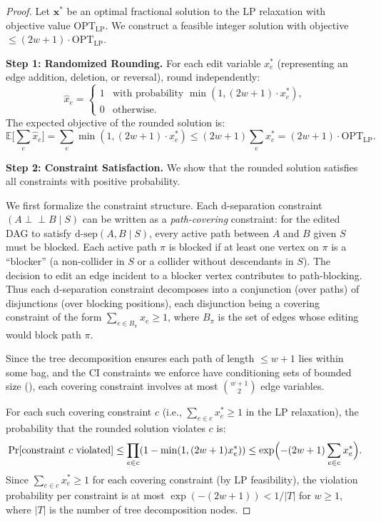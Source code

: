 \documentclass[11pt,a4paper]{article}
\theoremstyle{definition}
\theoremstyle{remark}
\newcommand{\CI}{\perp\!\!\!\perp}
\newcommand{\dsep}{\mathrm{d\text{-}sep}}
\newcommand{\E}{\mathbb{E}}
\begin{document}
\begin{proof}
Let $\mathbf{x}^*$ be an optimal fractional solution to the LP relaxation with objective
value $\mathrm{OPT}_{\mathrm{LP}}$. We construct a feasible integer solution with
objective $\leq (2w+1) \cdot \mathrm{OPT}_{\mathrm{LP}}$.

\medskip
\noindent\textbf{Step 1: Randomized Rounding.}
For each edit variable $x_e^*$ (representing an edge addition, deletion, or reversal),
round independently:
\[
  \hat{x}_e = \begin{cases}
    1 & \text{with probability } \min(1, (2w+1) \cdot x_e^*), \\
    0 & \text{otherwise.}
  \end{cases}
\]
The expected objective of the rounded solution is:
\[
  \E\bigl[\textstyle\sum_e \hat{x}_e\bigr]
  = \sum_e \min(1, (2w+1) \cdot x_e^*)
  \leq (2w+1) \sum_e x_e^*
  = (2w+1) \cdot \mathrm{OPT}_{\mathrm{LP}}.
\]

\medskip
\noindent\textbf{Step 2: Constraint Satisfaction.}
We show that the rounded solution satisfies all constraints with positive probability.

We first formalize the constraint structure. Each d-separation constraint
$(A \CI B \mid S)$ can be written as a \emph{path-covering} constraint: for the edited
DAG to satisfy $\dsep(A, B \mid S)$, every active path between $A$ and $B$ given $S$
must be blocked. Each active path $\pi$ is blocked if at least one vertex on $\pi$ is a
``blocker'' (a non-collider in $S$ or a collider without descendants in $S$). The
decision to edit an edge incident to a blocker vertex contributes to path-blocking.
Thus each d-separation constraint decomposes into a conjunction (over paths) of
disjunctions (over blocking positions), each disjunction being a covering constraint
of the form $\sum_{e \in B_\pi} x_e \geq 1$, where $B_\pi$ is the set of edges whose
editing would block path $\pi$.

Since the tree decomposition ensures each path of length $\leq w+1$ lies within some
bag, and the CI constraints we enforce have conditioning sets of bounded size
(), each covering constraint involves at most $\binom{w+1}{2}$
edge variables.

For each such covering constraint $c$ (i.e., $\sum_{e \in c} x_e^* \geq 1$ in the LP
relaxation), the probability that the rounded solution violates $c$ is:
\[
  \Pr[\text{constraint $c$ violated}] \leq \prod_{e \in c} (1 - \min(1, (2w+1) x_e^*))
  \leq \exp\Bigl(-(2w+1) \sum_{e \in c} x_e^*\Bigr).
\]
Since $\sum_{e \in c} x_e^* \geq 1$ for each covering constraint (by LP feasibility),
the violation probability per constraint is at most $\exp(-(2w+1)) < 1/|T|$ for
$w \geq 1$, where $|T|$ is the number of tree decomposition nodes.


\end{proof}
\end{document}

